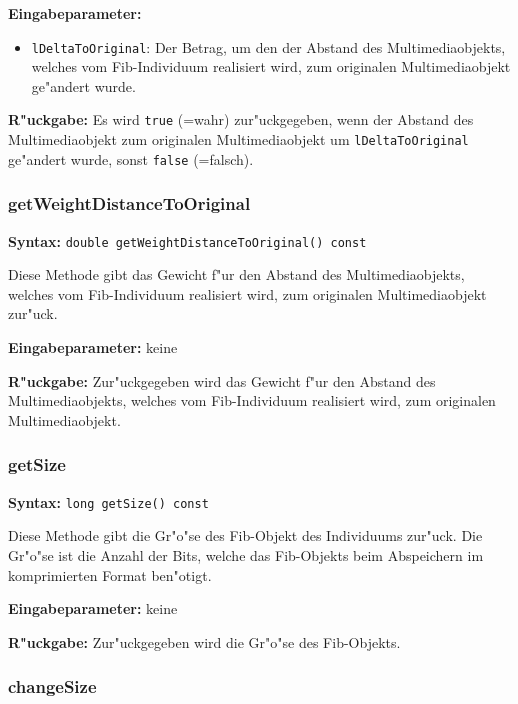 \bigskip\noindent
\textbf{Eingabeparameter:}
\begin{itemize}
 \item \verb|lDeltaToOriginal|: Der Betrag, um den der Abstand des Multimediaobjekts, welches vom Fib-Individuum realisiert wird, zum originalen Multimediaobjekt ge"andert wurde.
\end{itemize}

\bigskip\noindent
\textbf{R"uckgabe:} Es wird \verb|true| (=wahr) zur"uckgegeben, wenn der Abstand des Multimediaobjekt zum originalen Multimediaobjekt um \verb|lDeltaToOriginal| ge"andert wurde, sonst \verb|false| (=falsch).


\subsubsection{getWeightDistanceToOriginal}

\textbf{Syntax:} \verb|double getWeightDistanceToOriginal() const|

\bigskip\noindent
Diese Methode gibt das Gewicht f"ur den Abstand des Multimediaobjekts, welches vom Fib-Individuum realisiert wird, zum originalen Multimediaobjekt zur"uck.

\bigskip\noindent
\textbf{Eingabeparameter:} keine

\bigskip\noindent
\textbf{R"uckgabe:} Zur"uckgegeben wird das Gewicht f"ur den Abstand des Multimediaobjekts, welches vom Fib-Individuum realisiert wird, zum originalen Multimediaobjekt.


\subsubsection{getSize}

\textbf{Syntax:} \verb|long getSize() const|

\bigskip\noindent
Diese Methode gibt die Gr"o"se des Fib-Objekt des Individuums zur"uck. Die Gr"o"se ist die Anzahl der Bits, welche das Fib-Objekts beim Abspeichern im komprimierten Format ben"otigt.

\bigskip\noindent
\textbf{Eingabeparameter:} keine

\bigskip\noindent
\textbf{R"uckgabe:} Zur"uckgegeben wird die Gr"o"se des Fib-Objekts.


\subsubsection{changeSize}


